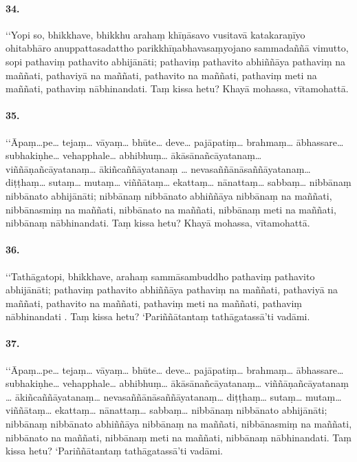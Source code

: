
\paragraph{34.} ‘‘Yopi so, bhikkhave, bhikkhu arahaṃ khīṇāsavo vusitavā katakaraṇīyo ohitabhāro anuppattasadattho parikkhīṇabhavasaṃyojano sammadaññā vimutto, sopi pathaviṃ pathavito abhijānāti; pathaviṃ pathavito abhiññāya pathaviṃ na maññati, pathaviyā na maññati, pathavito na maññati, pathaviṃ meti na maññati, pathaviṃ nābhinandati. Taṃ kissa hetu? Khayā mohassa, vītamohattā.

\paragraph{35.} ‘‘Āpaṃ…pe… tejaṃ… vāyaṃ… bhūte… deve… pajāpatiṃ… brahmaṃ… ābhassare… subhakiṇhe… vehapphale… abhibhuṃ… ākāsānañcāyatanaṃ… viññāṇañcāyatanaṃ… ākiñcaññāyatanaṃ … nevasaññānāsaññāyatanaṃ… diṭṭhaṃ… sutaṃ… mutaṃ… viññātaṃ… ekattaṃ… nānattaṃ… sabbaṃ… nibbānaṃ nibbānato abhijānāti; nibbānaṃ nibbānato abhiññāya nibbānaṃ na maññati, nibbānasmiṃ na maññati, nibbānato na maññati, nibbānaṃ meti na maññati, nibbānaṃ nābhinandati. Taṃ kissa hetu? Khayā mohassa, vītamohattā.


\paragraph{36.} ‘‘Tathāgatopi, bhikkhave, arahaṃ sammāsambuddho pathaviṃ pathavito abhijānāti; pathaviṃ pathavito abhiññāya pathaviṃ na maññati, pathaviyā na maññati, pathavito na maññati, pathaviṃ meti na maññati, pathaviṃ nābhinandati . Taṃ kissa hetu? ‘Pariññātantaṃ tathāgatassā’ti vadāmi.

\paragraph{37.} ‘‘Āpaṃ…pe… tejaṃ… vāyaṃ… bhūte… deve… pajāpatiṃ… brahmaṃ… ābhassare… subhakiṇhe… vehapphale… abhibhuṃ… ākāsānañcāyatanaṃ… viññāṇañcāyatanaṃ … ākiñcaññāyatanaṃ… nevasaññānāsaññāyatanaṃ… diṭṭhaṃ… sutaṃ… mutaṃ… viññātaṃ… ekattaṃ… nānattaṃ… sabbaṃ… nibbānaṃ nibbānato abhijānāti; nibbānaṃ nibbānato abhiññāya nibbānaṃ na maññati, nibbānasmiṃ na maññati, nibbānato na maññati, nibbānaṃ meti na maññati, nibbānaṃ nābhinandati. Taṃ kissa hetu? ‘Pariññātantaṃ tathāgatassā’ti vadāmi.

